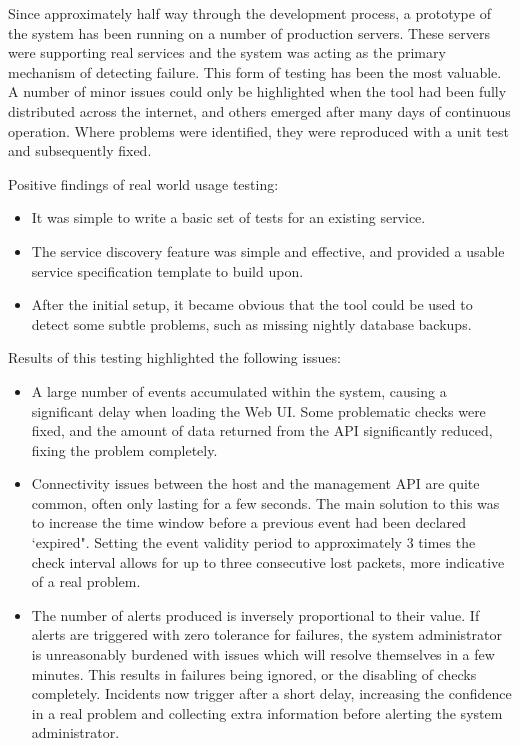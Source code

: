 \documentclass{cshonours}
\begin{document}
Since approximately half way through the development process, a prototype of the system has been running on a number of production servers. These servers were supporting real services and the system was acting as the primary mechanism of detecting failure. This form of testing has been the most valuable. A number of minor issues could only be highlighted when the tool had been fully distributed across the internet, and others emerged after many days of continuous operation. Where problems were identified, they were reproduced with a unit test and subsequently fixed.

Positive findings of real world usage testing:

\begin{itemize}
  \item It was simple to write a basic set of tests for an existing service.
  \item The service discovery feature was simple and effective, and provided a usable service specification template to build upon.
  \item After the initial setup, it became obvious that the tool could be used to detect some subtle problems, such as missing nightly database backups.
\end{itemize}

Results of this testing highlighted the following issues:

\begin{itemize}
  \item A large number of events accumulated within the system, causing a significant delay when loading the Web UI. Some problematic checks were fixed, and the amount of data returned from the API significantly reduced, fixing the problem completely.
  \item Connectivity issues between the host and the management API are quite common, often only lasting for a few seconds. The main solution to this was to increase the time window before a previous event had been declared `expired". Setting the event validity period to approximately 3 times the check interval allows for up to three consecutive lost packets, more indicative of a real problem.
  \item The number of alerts produced is inversely proportional to their value. If alerts are triggered with zero tolerance for failures, the system administrator is unreasonably burdened with issues which will resolve themselves in a few minutes. This results in failures being ignored, or the disabling of checks completely. Incidents now trigger after a short delay, increasing the confidence in a real problem and collecting extra information before alerting the system administrator.
\end{itemize}
\end{document}
